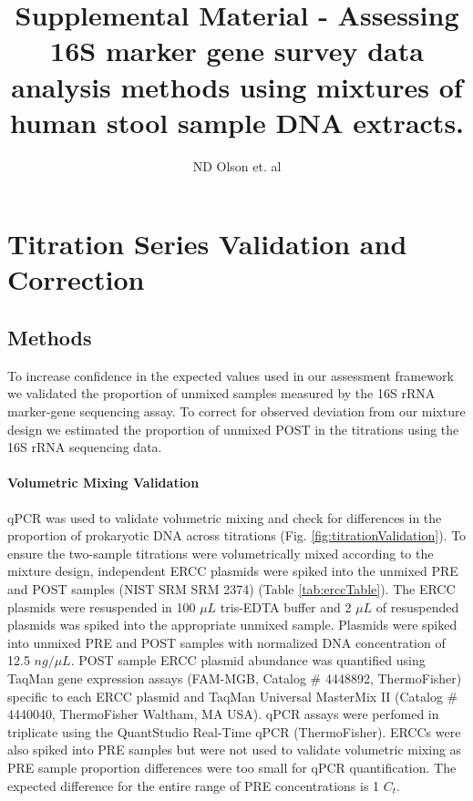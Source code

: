 \documentclass[12pt]{article}
\title{Supplemental Material - Assessing 16S marker gene survey data analysis methods using mixtures of human stool sample DNA extracts.}
\author{ND Olson et. al}
\begin{document}
\maketitle

\section*{Titration Series Validation and Correction}
\subsection*{Methods}
To increase confidence in the expected values used in our assessment framework we validated the proportion of unmixed samples measured by the 16S rRNA marker-gene sequencing assay.
To correct for observed deviation from our mixture design we estimated the proportion of unmixed POST in the titrations using the 16S rRNA sequencing data.

\paragraph*{Volumetric Mixing Validation}

qPCR was used to validate volumetric mixing and check for differences in
the proportion of prokaryotic DNA across titrations
(Fig. \ref{fig:titrationValidation}). To ensure the two-sample titrations
were volumetrically mixed according to the mixture design,
independent ERCC plasmids were spiked into the unmixed PRE and
POST samples \cite{baker2005external} (NIST SRM SRM 2374) (Table
\ref{tab:erccTable}). The ERCC plasmids were resuspended in 100
\(\mu L\) tris-EDTA buffer and 2 \(\mu L\) of resuspended plasmids was
spiked into the appropriate unmixed sample. Plasmids were spiked into
unmixed PRE and POST samples with normalized DNA concentration of
12.5 \(ng/\mu L\). POST sample ERCC plasmid abundance was quantified
using TaqMan gene expression assays (FAM-MGB, Catalog \# 4448892,
ThermoFisher) specific to each ERCC plasmid and TaqMan Universal
MasterMix II (Catalog \# 4440040, ThermoFisher Waltham, MA USA).
qPCR assays were perfomed in triplicate using the QuantStudio
Real-Time qPCR (ThermoFisher). ERCCs were also spiked into PRE
samples but were not used to validate volumetric mixing as PRE sample
proportion differences were too small for qPCR quantification.
The expected difference for the entire range of PRE concentrations
is 1 \(C_t\).
\end{document}
